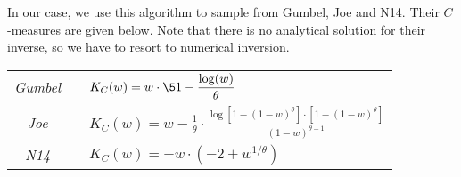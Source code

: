 \documentclass[12pt,a4paper]{article}
\begin{document}
In our case, we use this algorithm to sample from Gumbel, Joe and N14. Their $C$-measures are given  below. Note that there is no analytical solution for their inverse, so we have to resort to numerical inversion.

\vspace{0.2cm}
{\centering
\renewcommand{\arraystretch}{1.8}  
\begin{tabular}{ccp{10cm}}
\textit{Gumbel} && $\displaystyle K_C(w)=w \cdot \5{1- \frac{\log (w)}{\theta}}$ 
\\
\textit{Joe} && $\displaystyle K_C(w) = w - \frac{1}{\theta} 
\cdot 
\frac{\log[1-(1-w)^{\theta}] \cdot [1-(1-w)^{\theta}]}
{(1-w)^{\theta-1}}$ 
\\
\textit{N14} && $\displaystyle K_C(w) = -w \cdot (-2 + w^{1/\theta})$ 
\\
\end{tabular}
\par}

\end{document}
